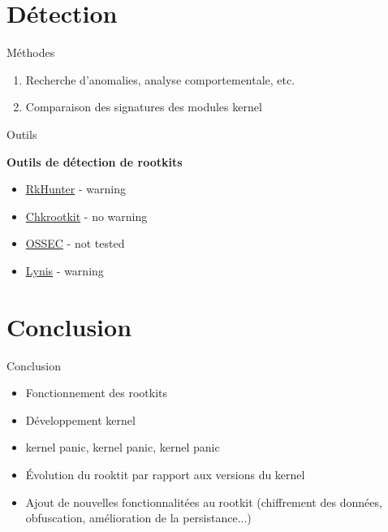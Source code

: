 \documentclass[10pt]{beamer}
\begin{document}
\section{Détection}

\begin{frame}{Méthodes}
	
	\begin{alertblock}{}
		\begin{enumerate}
			\item Recherche d'anomalies, analyse comportementale, etc.
			\item Comparaison des signatures des modules kernel
		\end{enumerate}
    \end{alertblock}
	

\end{frame}

\begin{frame}{Outils}
	
	\textbf{Outils de détection de rootkits}
	\begin{itemize}
		\item \href{http://rkhunter.sourceforge.net/}{RkHunter} - \alert{warning}
		\item \href{http://www.chkrootkit.org/}{Chkrootkit} - {\color[rgb]{0,0.8,0.3} no warning}
		\item \href{http://ossec.github.io/}{OSSEC}   - {\color{gray} not tested}
		\item \href{https://cisofy.com/lynis/}{Lynis} - \alert{warning}
	\end{itemize}
	
\end{frame}


\section*{Conclusion}

\begin{frame}{Conclusion}
	
	\begin{alertblock}{}
	\begin{itemize}
		\item Fonctionnement des rootkits
		\item Développement kernel
		\item kernel panic, kernel panic, kernel panic
		\item Évolution du rooktit par rapport aux versions du kernel
		\item Ajout de nouvelles fonctionnalitées au rootkit (chiffrement des données, obfuscation, amélioration de la persistance...)
	\end{itemize}
    \end{alertblock}

\end{frame}
\end{document}

